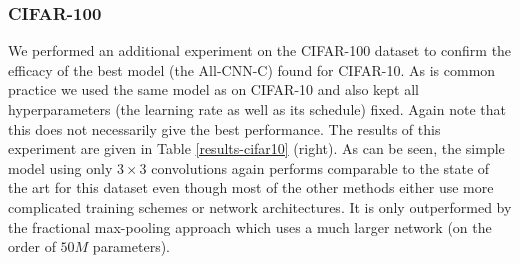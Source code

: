 \documentclass{article} %
\begin{document}
 
\subsubsection{CIFAR-100}
We performed an additional experiment on the CIFAR-100 dataset to
confirm the efficacy of the best model (the All-CNN-C) found for
CIFAR-10. As is common practice we used the same model as on CIFAR-10
and also kept all hyperparameters (the learning rate as well as its
schedule) fixed. Again note that this does not necessarily give the
best performance. The results of this experiment are given in Table
\ref{results-cifar10} (right). As can be seen, the simple model using only $3\times3$
convolutions again performs comparable to the state of the art
for this dataset even though most of the other methods either use more
complicated training schemes or network architectures. 
It is only outperformed by the fractional max-pooling approach \citep{Graham2015} which uses
a much larger network (on the order of $50 M$ parameters).
\end{document}
